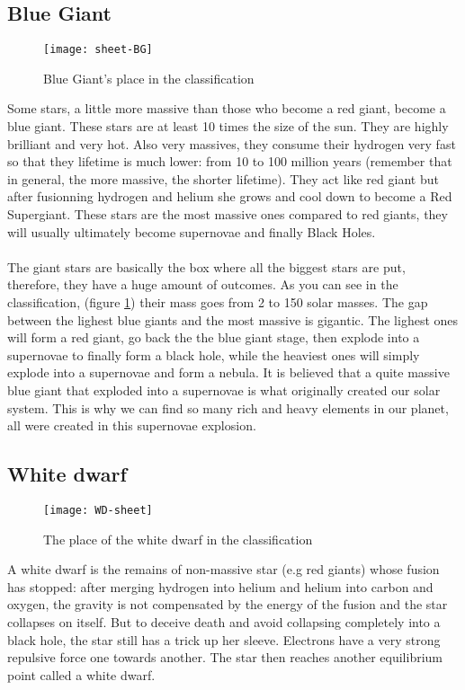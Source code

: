\documentclass[a4paper, 11pt]{article} %
\begin{document}
\subsection{Blue Giant}

\begin{figure}[h]
\centering
\texttt{[image: sheet-BG]}
\caption{Blue Giant's place in the classification}
\label{SheetBG}
\end{figure}
 
Some stars, a little more massive than those who become a red giant, become a blue giant. These stars are at least 10 times the size of the sun. They are highly brilliant and very hot. Also very massives, they consume their hydrogen very fast so that they lifetime is much lower: from 10 to 100 million years (remember that in general, the more massive, the shorter lifetime). They act like red giant but after fusionning hydrogen and helium she grows and cool down to become a Red Supergiant. These stars are the most massive ones compared to red giants, they will usually ultimately become supernovae and finally Black Holes. 
\paragraph*{}
The giant stars are basically the box where all the biggest stars are put, therefore, they have a huge amount of outcomes. As you can see in the classification, (figure \ref{SheetBG}) their mass goes from 2 to 150 solar masses. The gap between the lighest blue giants and the most massive is gigantic. The lighest ones will form a red giant, go back the the blue giant stage, then explode into a supernovae to finally form a black hole, while the heaviest ones will simply explode into a supernovae and form a nebula. It is believed that a quite massive blue giant that exploded into a supernovae is what originally created our solar system. This is why we can find so many rich and heavy elements in our planet, all were created in this supernovae explosion.

\subsection{White dwarf}

\begin{figure}[h]
\centering
\texttt{[image: WD-sheet]}
\caption{The place of the white dwarf in the classification }
\end{figure}

\label{whiteDwarf}
A white dwarf is the remains of non-massive star (e.g red giants) whose fusion has stopped: after merging hydrogen into helium and helium into carbon and oxygen, the gravity is not compensated by the energy of the fusion and the star collapses on itself. But to deceive death and avoid collapsing completely into a black hole, the star still has a trick up her sleeve. Electrons have a very strong repulsive force one towards another. The star then reaches another equilibrium point called a white dwarf.
\end{document}
